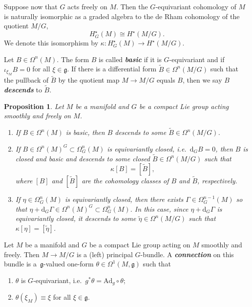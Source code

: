 \documentclass[11pt]{article}
\newtheorem{Proposition}[Theorem]{Proposition}
\numberwithin{equation}{section}
\newcommand{\deff}[1]{\textbf{\emph{#1}}}
\newcommand{\func}[3]{#1 \colon #2 \to #3}
\newcommand{\litlet}{\renewcommand{\labelenumi}{(\alph{enumi})}}
\begin{document}
Suppose now that $G$ acts freely on $M$.  Then the $G$-equivariant cohomology of $M$ is naturally isomorphic as a graded algebra to the de Rham cohomology of the quotient $M/G$,
\[
  H_G^{\star}(M) \cong H^{\star} (M/G).
\]
We denote this isomorphism by $\func{\kappa}{H_G^{\star}(M)}{H^{\star}(M/G)}$.

Let $B \in \Omega^n(M)$.  The form $B$ is called \deff{basic} if it is $G$-equivariant and if $\iota_{\xi_M} B = 0$ for all $\xi \in \mathfrak{g}$.  If there is a dif\/ferential form $\widetilde{B} \in \Omega^n(M/G)$ such that the pullback of $\widetilde{B}$ by the quotient map $M \to M/G$ equals $B$, then we say $B$ \deff{descends} to $\widetilde{B}$.


\begin{Proposition}
Let $M$ be a manifold and $G$ be a compact Lie group acting smoothly and freely on $M$.
\begin{enumerate} \itemsep=0pt\litlet
  \item If $B \in \Omega^n(M)$ is basic, then $B$ descends to some $\widetilde{B} \in \Omega^n(M/G)$.
  \item If $B \in \Omega^n(M)^G \subset \Omega_G^n(M)$ is equivariantly closed, i.e.\ $\mathrm{d}_G B = 0$, then $B$ is closed and basic and descends to some closed $\widetilde{B} \in \Omega^n(M/G)$ such that
    \[
      \kappa[B] = [\widetilde{B}],
    \]
  where $[B]$ and $[\widetilde{B}]$ are the cohomology classes of $B$ and $\widetilde{B}$, respectively.
  \item If $\eta \in \Omega_G^n(M)$ is equivariantly closed, then there exists $\Gamma \in \Omega_G^{n-1}(M)$ so that $\eta + \mathrm{d}_G \Gamma \in \Omega^n(M)^G \subset \Omega_G^n(M)$.  In this case, since $\eta + \mathrm{d}_G \Gamma$ is equivariantly closed, it descends to some $\widetilde{\eta} \in \Omega^n(M/G)$ such that $\kappa[\eta] = [\widetilde{\eta}]$.
\end{enumerate}
\end{Proposition}


\begin{Definition} \label{def3}
Let $M$ be a manifold and $G$ be a compact Lie group acting on $M$ smoothly and freely.  Then $M \to M/G$ is a (left) principal $G$-bundle.  A \deff{connection} on this bundle is a~$\mathfrak{g}$-valued one-form $\theta \in \Omega^1(M,\mathfrak{g})$ such that
\begin{enumerate}\itemsep=0pt
  \item $\theta$ is $G$-equivariant, i.e.\ $g^* \theta = \mathrm{Ad}_g \circ \theta$;
  \item $\theta (\xi_M) \equiv \xi$ for all $\xi \in \mathfrak{g}$.
\end{enumerate}
\end{Definition}
\end{document}
